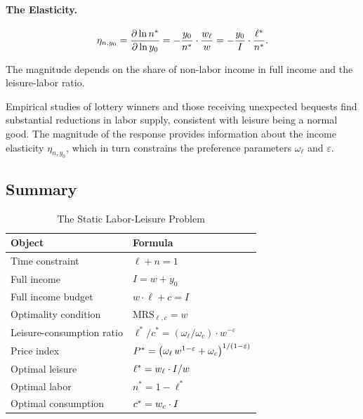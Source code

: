 \paragraph{The Elasticity.}
\begin{equation}
\eta_{n,y_0} = \frac{\partial \ln n^*}{\partial \ln y_0} = -\frac{y_0}{n^*} \cdot \frac{w_\ell}{w} = -\frac{y_0}{I} \cdot \frac{\ell^*}{n^*}.
\label{eq:labor-income-elasticity}
\end{equation}

The magnitude depends on the share of non-labor income in full income and the leisure-labor ratio.

\begin{calloutnote}
Empirical studies of lottery winners and those receiving unexpected bequests find substantial reductions in labor supply, consistent with leisure being a normal good. The magnitude of the response provides information about the income elasticity $\eta_{n,y_0}$, which in turn constrains the preference parameters $\omega_\ell$ and $\varepsilon$.
\end{calloutnote}

\subsection{Summary}
\label{subsec:labor-static-summary}

\begin{table}[H]
\centering
\caption{The Static Labor-Leisure Problem}
\label{tab:labor-static-summary}
\renewcommand{\arraystretch}{1.6}
\begin{tabular}{@{}ll@{}}
\toprule
\textbf{Object} & \textbf{Formula} \\
\midrule
Time constraint & $\ell + n = 1$ \\[6pt]
Full income & $I = w + y_0$ \\[6pt]
Full income budget & $w \cdot \ell + c = I$ \\[6pt]
Optimality condition & $\text{MRS}_{\ell,c} = w$ \\[6pt]
Leisure-consumption ratio & $\ell^* / c^* = (\omega_\ell/\omega_c) \cdot w^{-\varepsilon}$ \\[6pt]
Price index & $P^{*} = \left( \omega_\ell \, w^{1-\varepsilon} + \omega_c \right)^{1/(1-\varepsilon)}$ \\[6pt]
Optimal leisure & $\ell^* = w_\ell \cdot I / w$ \\[6pt]
Optimal labor & $n^* = 1 - \ell^*$ \\[6pt]
Optimal consumption & $c^* = w_c \cdot I$ \\[6pt]
\bottomrule
\end{tabular}
\end{table}

